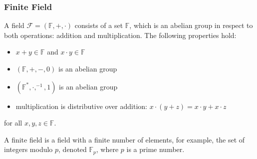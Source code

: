 \subsubsection{Finite Field}
A field $\mathcal{F} = (\mathbb{F}, +, \cdot)$ consists of a set $\mathbb{F}$, which is an abelian group in respect to both operations: addition and multiplication. The following properties hold:
\begin{itemize}
    \item $x + y \in \mathbb{F}$ and $x \cdot y \in \mathbb{F}$
    \item $(\mathbb{F}, +, -, 0)$ is an abelian group
    \item $(\mathbb{F}^*, \cdot, ^{-1}, 1)$ is an abelian group
    \item multiplication is distributive over addition: $x \cdot (y + z) = x \cdot y + x \cdot z$
\end{itemize}
for all $x, y, z \in \mathbb{F}$.

A finite field is a field with a finite number of elements, for example, the set of integers modulo $p$, denoted $\mathbb{F}_p$, where $p$ is a prime number.
